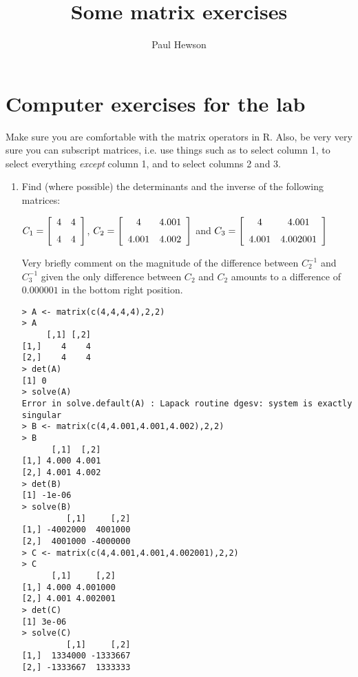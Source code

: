 \documentclass{article}
\title{Some matrix exercises}
\author{Paul Hewson}
\begin{document}
\maketitle

\section{Computer exercises for the lab}

Make sure you are comfortable with the matrix operators in R.   Also, be very very sure you can subscript matrices, i.e. use things such as \text{[,1]} to select column 1, \text{[,-1]} to select everything \emph{except} column 1, and \text{[,2:3]} to select columns 2 and 3.

\begin{enumerate}

\item Find (where possible) the determinants and the inverse of the following matrices:

$C_{1} = \left[ \begin {array}{cc} 4& 4\\\noalign{\medskip} 4& 4\end {array} \right]$, $C_{2} = \left[ \begin {array}{cc} 4& 4.001\\\noalign{\medskip} 4.001& 4.002\end {array} \right]$ and $C_{3} = \left[ \begin {array}{cc} 4& 4.001\\\noalign{\medskip} 4.001& 4.002001\end {array} \right] $

Very briefly comment on the magnitude of the difference between $C_{2}^{-1}$ and  $C_{3}^{-1}$ given the only difference between $C_{2}$ and $C_{2}$ amounts to a difference of $0.000001$ in the bottom right position.

\begin{verbatim}
> A <- matrix(c(4,4,4,4),2,2)
> A
     [,1] [,2]
[1,]    4    4
[2,]    4    4
> det(A)
[1] 0
> solve(A)
Error in solve.default(A) : Lapack routine dgesv: system is exactly singular
> B <- matrix(c(4,4.001,4.001,4.002),2,2)
> B
      [,1]  [,2]
[1,] 4.000 4.001
[2,] 4.001 4.002
> det(B)
[1] -1e-06
> solve(B)
         [,1]     [,2]
[1,] -4002000  4001000
[2,]  4001000 -4000000
> C <- matrix(c(4,4.001,4.001,4.002001),2,2)
> C
      [,1]     [,2]
[1,] 4.000 4.001000
[2,] 4.001 4.002001
> det(C)
[1] 3e-06
> solve(C)
         [,1]     [,2]
[1,]  1334000 -1333667
[2,] -1333667  1333333
\end{verbatim}


\end{enumerate}
\end{document}
